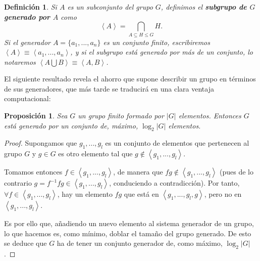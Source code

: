 \documentclass[11pt,a4paper,twoside,pdf]{article}
\numberwithin{equation}{section}
\newtheorem{definition}{Definición}
\newtheorem{proposition}{Proposición}
\begin{document}
		\begin{definition} \label{def: generador grupo}
			Si $A$ es un subconjunto del grupo $G$, definimos el \textbf{subgrupo de $G$ generado por $A$} como \[\left\langle A \right\rangle = \displaystyle\bigcap_{A \subseteq H \le G} H. \]
			Si el generador $A=\{a_1,...,a_n\}$ es un conjunto finito, escribiremos $\left\langle A\right\rangle \equiv \left\langle a_1,...,a_n\right\rangle $, y si el subgrupo está generado por más de un conjunto, lo notaremos $\left\langle A\bigcup B\right\rangle \equiv \left\langle A,B\right\rangle $.
		\end{definition} 
	
	
	
	El siguiente resultado revela el ahorro que supone describir un grupo en términos de sus generadores, que más tarde se traducirá en una clara ventaja computacional:
	
		\begin{proposition} \label{prop: generadores}
			Sea $G$ un grupo finito formado por $|G|$ elementos. Entonces $G$ está generado por un conjunto de, máximo, $\log_2|G|$ elementos.
		\end{proposition}
	
		\begin{proof}
			Supongamos que $g_1,...,g_l$ es un conjunto de elementos que pertenecen al grupo $G$ y $g\in G$ es otro elemento tal que $g\notin \left\langle g_1,...,g_l\right\rangle$.
		
			Tomamos entonces $f\in \left\langle g_1,...,g_l\right\rangle$, de manera que $fg\notin \left\langle g_1,...,g_l\right\rangle$ (pues de lo contrario $g=f^{-1}fg\in \left\langle g_1,...,g_l\right\rangle$, conduciendo a contradicción). Por tanto, $ \forall f \in \left\langle g_1,...,g_l\right\rangle$, hay un elemento $fg$ que está en $\left\langle g_1,...,g_l,g\right\rangle$, pero no en $\left\langle g_1,...,g_l\right\rangle$.
		
			Es por ello que, añadiendo un nuevo elemento al sistema generador de un grupo, lo que hacemos es, como mínimo, doblar el tamaño del grupo generado. De esto se deduce que $G$ ha de tener un conjunto generador de, como máximo, $\log_2|G|$.
		\end{proof}
\end{document}
